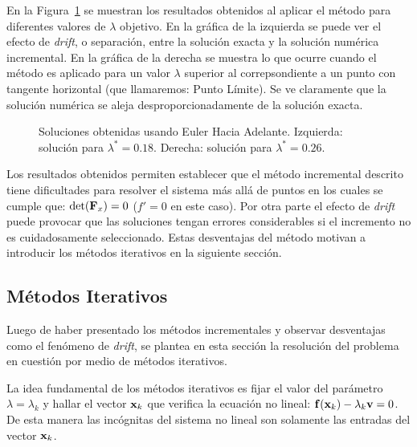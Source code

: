 En la Figura~\ref{fig:fig1} se muestran los resultados obtenidos al aplicar el método para diferentes valores de $\lambda$ objetivo. %
En la gráfica de la izquierda se puede ver el efecto de \textit{drift}, o separación, entre la solución exacta y la solución numérica incremental. %
En la gráfica de la derecha se muestra lo que ocurre cuando el método es aplicado para un valor $\lambda$ superior al correpsondiente a un punto con tangente horizontal (que llamaremos: Punto Límite). %
%
Se ve claramente que la solución numérica se aleja desproporcionadamente de la solución exacta.

\begin{figure}[htb]
	\centering
	\resizebox{\textwidth}{!}{}
	\caption{Soluciones obtenidas usando Euler Hacia Adelante. Izquierda: solución para $\lambda^*=0.18$. Derecha: solución para $\lambda^*=0.26$.}
	\label{fig:fig1}
\end{figure}

Los resultados obtenidos permiten establecer que el método incremental descrito tiene dificultades para resolver el sistema más allá de puntos en los cuales se cumple que: $\det({\bf F}_x)=0$ ($f'=0$ en este caso). %
%
Por otra parte el efecto de \textit{drift} puede provocar que las soluciones tengan errores considerables si el incremento no es cuidadosamente seleccionado. %
%
Estas desventajas del método motivan a introducir los métodos iterativos en la siguiente sección.




%
%
\subsection{Métodos Iterativos}\label{Iter}

Luego de haber presentado los métodos incrementales y observar desventajas como el fenómeno de \textit{drift}, se plantea en esta sección la resolución del problema en cuestión por medio de métodos iterativos. %

La idea fundamental de los métodos iterativos es fijar el valor del parámetro $\lambda=\lambda_k$ y hallar el vector ${\bf x}_k$ que verifica la ecuación no lineal: ${\bf f}({\bf x}_k)-\lambda_k {\bf v}=0$. De esta manera las incógnitas del sistema no lineal son solamente las entradas del vector ${\bf x}_k$.

